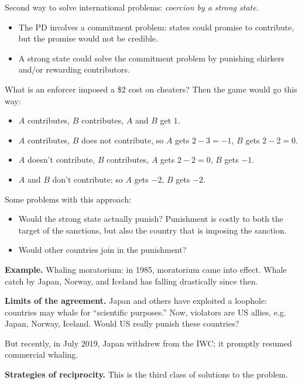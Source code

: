 \documentclass{article}
\begin{document}
  Second way to solve international problems: {\it coercion by a strong state.}

  \begin{itemize}
    \item The PD involves a commitment problem: states could promise to contribute, but the promise would not be credible.
    \item A strong state could solve the commitment problem by punishing shirkers and/or rewarding contributors.
  \end{itemize}

  What is an enforcer imposed a \$2 cost on cheaters?  Then the game would go this way:

  \begin{itemize}
    \item $A$ contributes, $B$ contributes, $A$ and $B$ get $1$.
    \item $A$ contributes, $B$ does not contribute, so $A$ gets $2-3 = -1$, $B$ gets $2 - 2 = 0$.
    \item $A$ doesn't contribute, $B$ contributes, $A$ gets $2-2 = 0$, $B$ gets $-1$.
    \item $A$ and $B$ don't contribute; so $A$ gets $-2$, $B$ gets $-2$.
  \end{itemize}

  Some problems with this approach:

  \begin{itemize}
    \item Would the strong state actually punish?  Punishment is costly to both the target of the sanctions, but also the country that is imposing the sanction.
    \item Would other countries join in the punishment?
  \end{itemize}

  {\bf Example.} Whaling moratorium: in 1985, moratorium came into effect.  Whale catch by Japan, Norway, and Iceland has falling drastically since then.

  {\bf Limits of the agreement.} Japan and others have exploited a loophole: countries may whale for ``scientific purposes.''  Now, violators are US allies, e.g. Japan, Norway, Iceland.  Would US really punish these countries?

  But recently, in July 2019, Japan withdrew from the IWC; it promptly resumed commercial whaling.

  {\bf Strategies of reciprocity.} This is the third class of solutions to the problem.
\end{document}
